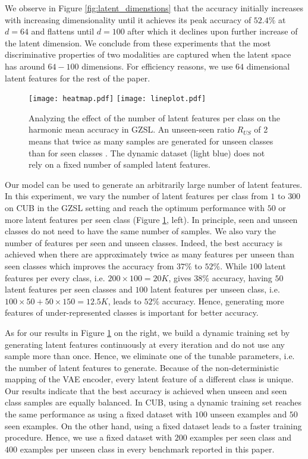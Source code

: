 \documentclass[10pt,twocolumn,letterpaper]{article}
\newcommand{\myparagraph}[1]{\vspace{6pt}\noindent{\bf #1}}
\begin{document}
We observe in Figure \ref{fig:latent_dimenstions} that the accuracy initially increases with increasing dimensionality until it achieves its peak accuracy of $52.4\%$ at $d=64$ and flattens until $d=100$ after which it declines upon further increase of the latent dimension. We conclude from these experiments that the most discriminative properties of two modalities are captured when the latent space has around $64-100$ dimensions. For efficiency reasons, we use $64$ dimensional latent features for the rest of the paper.



\begin{figure}[t]
\centering
\texttt{[image: heatmap.pdf]}
\hfill
\texttt{[image: lineplot.pdf]}
\caption{Analyzing the effect of the number of latent features per class on the harmonic mean accuracy in GZSL. An unseen-seen ratio $R_{US}$ of 2 means that twice as many samples are generated for unseen classes than for seen classes . The dynamic dataset (light blue) does not rely on a fixed number of sampled latent features.
}
\label{fig:dynamic_dataset}
\end{figure}

\myparagraph{Increasing Number of Latent Features.}
Our model can be used to generate an arbitrarily large number of latent features. In this experiment, we vary the number of latent features per class from $1$ to $300$ on CUB in the GZSL setting and reach the optimum performance with $50$ or more latent features per seen class (Figure \ref{fig:dynamic_dataset}, left). In principle, seen and unseen classes do not need to have the same number of samples.
We also vary the number of features per seen and unseen classes. Indeed, the best accuracy is achieved when there are approximately twice as many features per unseen than seen classes which improves the accuracy from $37\%$ to $52\%$. While $100$ latent features per every class, i.e. $200\times 100 =20K$, gives $38\%$ accuracy, having $50$ latent features per seen classes and $100$ latent features per unseen class, i.e. $100\times50 + 50\times150 = 12.5K$, leads to $52\%$ accuracy. Hence, generating more features of under-represented classes is important for better accuracy.




As for our results in Figure \ref{fig:dynamic_dataset} on the right, we build a dynamic training set by generating latent features continuously at every iteration and do not use any sample more than once. Hence, we eliminate one of the tunable parameters, i.e. the number of latent features to generate. Because of the non-deterministic mapping of the VAE encoder, every latent feature of a different class is unique. Our results indicate that the best accuracy is achieved when unseen and seen class samples are equally balanced. In CUB, using a dynamic training set reaches the same performance as using a fixed dataset with $100$ unseen examples and $50$ seen examples. On the other hand, using a fixed dataset leads to a faster training procedure. Hence, we use a fixed dataset with $200$ examples per seen class and $400$ examples per unseen class in every benchmark reported in this paper.
\end{document}
